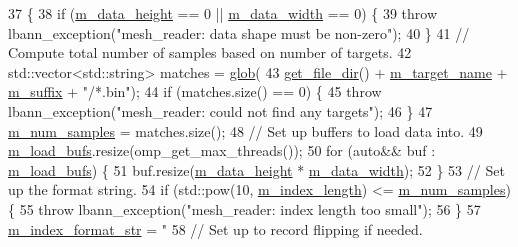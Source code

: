 \begin{DoxyCode}
37                        \{
38   \textcolor{keywordflow}{if} (\hyperlink{classlbann_1_1mesh__reader_aeb4e0df4e0be56244df5b663e2940d11}{m\_data\_height} == 0 || \hyperlink{classlbann_1_1mesh__reader_a8e16a565b0afd3097a0b6fe31a94641e}{m\_data\_width} == 0) \{
39     \textcolor{keywordflow}{throw} lbann\_exception(\textcolor{stringliteral}{"mesh\_reader: data shape must be non-zero"});
40   \}
41   \textcolor{comment}{// Compute total number of samples based on number of targets.}
42   std::vector<std::string> matches = \hyperlink{namespacelbann_a840c9f1d5f27bc30d081fb90529889e6}{glob}(
43     \hyperlink{classlbann_1_1generic__data__reader_ab4c6c2d4ba40ece809ce896828c8ff03}{get\_file\_dir}() + \hyperlink{classlbann_1_1mesh__reader_a838ab7976ce9e3d85e727159a7d4720c}{m\_target\_name} + \hyperlink{classlbann_1_1mesh__reader_aefadeb4ee1b9202dcadb4625da21c451}{m\_suffix} + \textcolor{stringliteral}{"/*.bin"});
44   \textcolor{keywordflow}{if} (matches.size() == 0) \{
45     \textcolor{keywordflow}{throw} lbann\_exception(\textcolor{stringliteral}{"mesh\_reader: could not find any targets"});
46   \}
47   \hyperlink{classlbann_1_1mesh__reader_a93eb02b667d92b912958f8dd1ec8af05}{m\_num\_samples} = matches.size();
48   \textcolor{comment}{// Set up buffers to load data into.}
49   \hyperlink{classlbann_1_1mesh__reader_a43bcee9494e51c397af690eb0291b168}{m\_load\_bufs}.resize(omp\_get\_max\_threads());
50   \textcolor{keywordflow}{for} (\textcolor{keyword}{auto}&& buf : \hyperlink{classlbann_1_1mesh__reader_a43bcee9494e51c397af690eb0291b168}{m\_load\_bufs}) \{
51     buf.resize(\hyperlink{classlbann_1_1mesh__reader_aeb4e0df4e0be56244df5b663e2940d11}{m\_data\_height} * \hyperlink{classlbann_1_1mesh__reader_a8e16a565b0afd3097a0b6fe31a94641e}{m\_data\_width});
52   \}
53   \textcolor{comment}{// Set up the format string.}
54   \textcolor{keywordflow}{if} (std::pow(10, \hyperlink{classlbann_1_1mesh__reader_a43c1aec4b0f635f6f7bf52944ace1883}{m\_index\_length}) <= \hyperlink{classlbann_1_1mesh__reader_a93eb02b667d92b912958f8dd1ec8af05}{m\_num\_samples}) \{
55     \textcolor{keywordflow}{throw} lbann\_exception(\textcolor{stringliteral}{"mesh\_reader: index length too small"});
56   \}
57   \hyperlink{classlbann_1_1mesh__reader_ae30866c8ae510d06eb63264de35917be}{m\_index\_format\_str} = \textcolor{stringliteral}{"%
58   \textcolor{comment}{// Set up to record flipping if needed.}
}
\end{DoxyCode}
